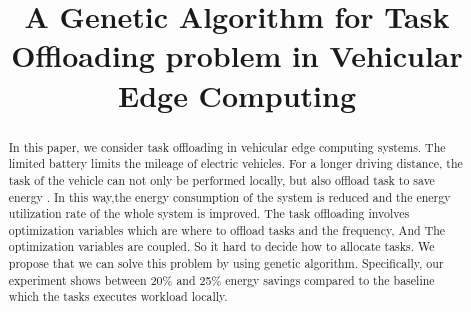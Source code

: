 \documentclass[conference]{IEEEtran}
\begin{document}
\title{A Genetic Algorithm for Task Offloading problem in Vehicular Edge Computing\\
}

\author{
\and
{}
\and
{}

}

\maketitle

\begin{abstract}
In this paper, we consider task offloading in vehicular edge computing systems.
The limited battery limits the mileage of electric vehicles. 
For a longer driving distance, the task of the vehicle can not only be performed locally, but also offload  task to save energy . 
In this way,the energy consumption of the system is reduced and the energy utilization rate of the whole system is improved. 
The task offloading involves optimization variables which are where to offload tasks and the frequency, And The optimization variables are coupled.
So it hard to decide how to allocate tasks. 
We propose that we can solve this problem by using  genetic algorithm. 
Specifically, our experiment shows between 20\% and 25\% energy savings compared to the baseline which the tasks executes workload locally.
\end{abstract}
\end{document}
